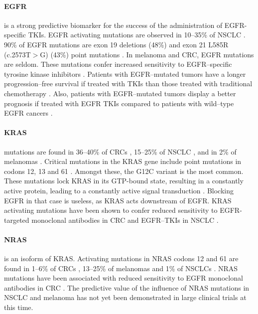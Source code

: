 {{      \paragraph{EGFR} is a strong predictive biomarker for the success of the
      administration of EGFR-specific TKIs. EGFR activating mutations are
      observed in 10--35\% of NSCLC {\cite{egfr_nsclc}}. 90\% of EGFR mutations are exon 19
      deletions (48\%) and exon 21 L585R (c.2573T$>$G) (43\%) point mutations {\cite{egfr_nsclc_2}}.
      In melanoma and CRC, EGFR mutations are seldom. These mutations confer
      increased sensitivity to EGFR--specific tyrosine kinase inhibitors  {\cite{egfr_nsclc_2}}.
      Patients with EGFR--mutated tumors have a longer progression--free
      survival if treated with TKIs than those treated with traditional
      chemotherapy {\cite{egfr_nsclc_2}}. Also, patients with EGFR--mutated tumors display a better
      prognosis if treated with EGFR TKIs compared to patients with wild--type
      EGFR cancers {\cite{egfr_nsclc_2}}.

      \paragraph{KRAS} mutations are found in 36--40\% of CRCs {\cite{kras_crc}}, 15--25\% of
      NSCLC {\cite{kras_nsclc}}, and in 2\% of melanomas {\cite{melanoma_kras}}. Critical mutations in the KRAS gene
      include point mutations in codons 12, 13 and 61 {\cite{kras_nsclc}} {\cite{kras_crc}}. Amongst these, the G12C
      variant is the most common. These mutations lock KRAS in its GTP-bound
      state, resulting in a constantly active protein, leading to a constantly
      active signal transduction {\cite{kras_activating}}. Blocking EGFR in that case is useless, as KRAS
      acts downstream of EGFR. KRAS activating mutations have been shown to
      confer reduced sensitivity to EGFR-targeted monoclonal antibodies in CRC
      and EGFR--TKIs in NSCLC {\cite{kras_nsclc}} {\cite{kras_crc}}.

      \paragraph{NRAS} is an isoform of KRAS. Activating mutations in NRAS
      codons 12 and 61 are found in 1--6\% of CRCs {\cite{nras_crc}}, 13--25\% of melanomas {\cite{nras_melanoma}} and
      1\% of NSCLCs {\cite{nras_nsclc}}. NRAS mutations have been associated with reduced
      sensitivity to EGFR monoclonal antibodies in CRC {\cite{nras_crc}}. The predictive value of
      the influence of NRAS mutations in NSCLC and melanoma has not yet been
      demonstrated in large clinical trials at this time.

}}
